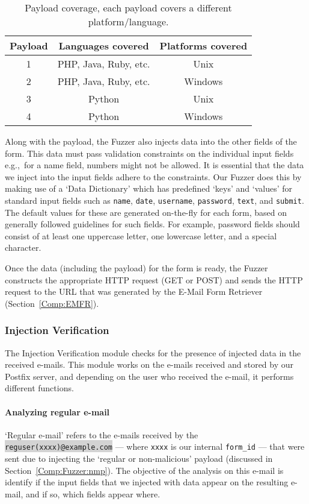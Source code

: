 \begin{table}[!htbp]
	\centering
	\begin{tabular}{|c|c|c|}
		\hline
		\multicolumn{1}{|c|}{\textbf{Payload}} & \multicolumn{1}{c}{\textbf{Languages covered}} & \multicolumn{1}{|c|}{\textbf{Platforms covered}}\\
		\hline
		1 & PHP, Java, Ruby, etc. & Unix\\
		\hline
		2 & PHP, Java, Ruby, etc. & Windows\\
		\hline
		3 & Python & Unix\\
		\hline
		4 & Python & Windows\\
		\hline
	\end{tabular}
	\caption[]{Payload coverage, each payload covers a different platform/language.}
	\label{tab:payloadcov}
\end{table}
Along with the payload, the Fuzzer also injects data into the other fields of the form. This data must pass validation constraints on the individual input fields e.g.,\ for a name field, numbers might not be allowed. It is essential that the data we inject into the input fields adhere to the constraints. Our Fuzzer does this by making use of a `Data Dictionary' which has predefined `keys' and `values' for standard input fields such as \texttt{name}, \texttt{date}, \texttt{username}, \texttt{password}, \texttt{text}, and \texttt{submit}. The default values for these are generated on-the-fly for each form, based on generally followed guidelines for such fields. For example, password fields should consist of at least one uppercase letter, one lowercase letter, and a special character.

Once the data (including the payload) for the form is ready, the Fuzzer constructs the appropriate HTTP request (GET or POST) and sends the HTTP request to the URL that was generated by the E-Mail Form Retriever (Section~\ref{Comp:EMFR}). 


\subsubsection{Injection Verification}
\label{Comp:EMA}
The Injection Verification module checks for the presence of injected data in the received e-mails. This module works on the e-mails received and stored by our Postfix server, and depending on the user who received the e-mail, it performs different functions.
\paragraph{Analyzing regular e-mail}
\sloppy
`Regular e-mail' refers to the e-mails received by the \colorbox{lightgray}{\lstinline{reguser(xxxx)@example.com}} --- where \texttt{xxxx} is our internal \texttt{form\_id} --- that were sent due to injecting the `regular or non-malicious' payload (discussed in Section~\ref{Comp:Fuzzer:nmp}). The objective of the analysis on this e-mail is identify if the input fields that we injected with data appear on the resulting e-mail, and if so, which fields appear where.

